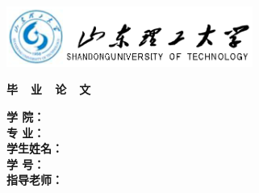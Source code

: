 {
  \setlength{\parindent}{0em}

  {
    \linespread{1}
    \begin{flushleft}
      \includegraphics[height=19.8mm]{data/cover-zh/logo.eps}
    \end{flushleft}

    \vspace{2em}
    
    {
      \heiti\sishiwu\bfseries
      \centering
      毕~~业~~论~~文 \par
    }
    \vspace{6em}
    
    {
      \heiti\erhao\bfseries
      \centering
      {\sduttitlec} \par
    }
    
  }
  

  \vspace{12em}

  {
    \linespread{1.6}
    \songti\sanhao\bfseries
    \centering
    \newlength{\titlelength}
    \setlength{\titlelength}{18em}
    学 \qquad 院： \; \underline{\makebox[\titlelength]{\sdutschoolc}}\\
    专 \qquad 业： \; \underline{\makebox[\titlelength]{\sdutmajorc}} \\
    学生姓名： \; \underline{\makebox[\titlelength]{\sdutstudentnamec}} \\
    学 \qquad 号： \; \underline{\makebox[\titlelength]{\sdutstudentidc}} \\
    指导老师： \; \underline{\makebox[\titlelength]{\instructorc}} \par
  }
  \vfill
  {
    \songti\sihao\bfseries
      \centering
      \sdutdatec \par
  }
}
